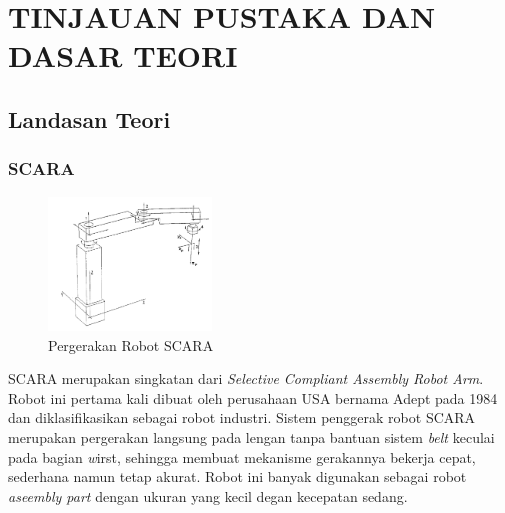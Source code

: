 
\chapter{TINJAUAN PUSTAKA DAN DASAR TEORI}                


\section{Landasan Teori}

  \subsection{SCARA}
  \begin{figure}[H]
  	\centering
  	\includegraphics[width=4.33cm]{scara.png}
  	\caption{Pergerakan Robot SCARA}
  \end{figure}
  
  SCARA merupakan singkatan dari \emph{Selective Compliant Assembly Robot Arm}. Robot ini pertama kali dibuat oleh perusahaan USA bernama Adept pada 1984 dan diklasifikasikan sebagai robot industri. Sistem penggerak robot SCARA merupakan pergerakan langsung pada lengan tanpa bantuan sistem \emph{belt} keculai pada bagian \emph wirst, sehingga membuat mekanisme gerakannya bekerja cepat, sederhana namun tetap akurat. Robot ini banyak digunakan sebagai robot \emph {aseembly part} dengan ukuran yang kecil degan kecepatan sedang. 
  
